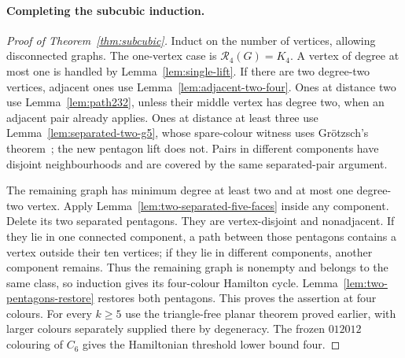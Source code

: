 \documentclass[11pt]{article}
\theoremstyle{remark}
\newcommand{\R}{\mathcal R}
\numberwithin{equation}{section}
\numberwithin{table}{section}
\begin{document}
\paragraph{Completing the subcubic induction.}
\begin{proof}[Proof of Theorem~\ref{thm:subcubic}]
Induct on the number of vertices, allowing disconnected graphs.
The one-vertex case is $\R_4(G)=K_4$. A vertex of degree at most one
is handled by Lemma~\ref{lem:single-lift}.
If there are two degree-two vertices, adjacent ones use Lemma~\ref{lem:adjacent-two-four}. Ones at distance two use Lemma~\ref{lem:path232}, unless their
middle vertex has degree two, when an adjacent pair already applies.
Ones at distance at least three use Lemma~\ref{lem:separated-two-g5}, whose spare-colour witness uses
Gr\"otzsch's theorem~\cite{Grotzsch59}; the new pentagon lift does not.
Pairs in different components have disjoint neighbourhoods and
are covered by the same separated-pair argument.

The remaining graph has minimum degree at least two and at most
one degree-two vertex. Apply Lemma~\ref{lem:two-separated-five-faces}
inside any component. Delete its two separated pentagons.  They are vertex-disjoint and
nonadjacent.  If they lie in one connected component, a path between
those pentagons contains a vertex outside their ten vertices; if they lie
in different components, another component remains.  Thus the remaining
graph is nonempty and belongs to the same class, so induction gives its
four-colour Hamilton cycle.
Lemma~\ref{lem:two-pentagons-restore} restores both pentagons.
This proves the assertion at four colours.
For every $k\ge5$ use the triangle-free planar theorem proved earlier,
with larger colours separately supplied there by degeneracy.
The frozen $012012$ colouring of $C_6$ gives the Hamiltonian
threshold lower bound four.
\end{proof}
\end{document}
